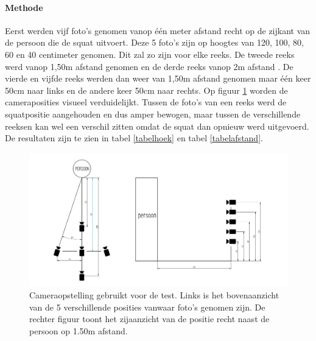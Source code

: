 \documentclass[a4paper,twoside,kulak]{kulakreport}
\begin{document}
\paragraph{Methode}
Eerst werden vijf foto’s genomen vanop één meter afstand recht op de zijkant van de persoon die de squat uitvoert. Deze 5 foto’s zijn op hoogtes van 120, 100, 80, 60 en 40 centimeter genomen. Dit zal zo zijn voor elke reeks. De tweede reeks werd vanop 1,50m afstand genomen en de derde reeks vanop 2m afstand . De vierde en vijfde reeks werden dan weer van 1,50m afstand genomen maar één keer 50cm naar links en de andere keer 50cm naar rechts. Op figuur \ref{cameraopstelling} worden de cameraposities visueel verduidelijkt. Tussen de foto’s van een reeks werd de squatpositie aangehouden en dus amper bewogen, maar tussen de verschillende reeksen kan wel een verschil zitten omdat de squat dan opnieuw werd uitgevoerd. De resultaten zijn te zien in tabel \ref{tabelhoek} en tabel \ref{tabelafstand}. 
\begin{figure}
	\centering
	\includegraphics[width=1.2\textwidth]{cameraopstelling}
	\caption{Cameraopstelling gebruikt voor de test. Links is het bovenaanzicht van de 5 verschillende posities vanwaar foto's genomen zijn. De rechter figuur toont het zijaanzicht van de positie recht naast de persoon op 1.50m afstand.}
	\label{cameraopstelling}
\end{figure}
\end{document}

